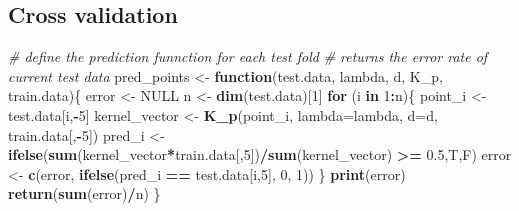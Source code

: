 \documentclass[12pt]{article}
\newenvironment{Shaded}{\begin{snugshade}}{\end{snugshade}}
\newcommand{\AttributeTok}[1]{\textcolor[rgb]{0.13,0.29,0.53}{#1}}
\newcommand{\CommentTok}[1]{\textcolor[rgb]{0.56,0.35,0.01}{\textit{#1}}}
\newcommand{\ConstantTok}[1]{\textcolor[rgb]{0.56,0.35,0.01}{#1}}
\newcommand{\ControlFlowTok}[1]{\textcolor[rgb]{0.13,0.29,0.53}{\textbf{#1}}}
\newcommand{\DecValTok}[1]{\textcolor[rgb]{0.00,0.00,0.81}{#1}}
\newcommand{\DocumentationTok}[1]{\textcolor[rgb]{0.56,0.35,0.01}{\textbf{\textit{#1}}}}
\newcommand{\FloatTok}[1]{\textcolor[rgb]{0.00,0.00,0.81}{#1}}
\newcommand{\FunctionTok}[1]{\textcolor[rgb]{0.13,0.29,0.53}{\textbf{#1}}}
\newcommand{\NormalTok}[1]{#1}
\newcommand{\OtherTok}[1]{\textcolor[rgb]{0.56,0.35,0.01}{#1}}
\newcommand{\RegionMarkerTok}[1]{#1}
\newcommand{\SpecialCharTok}[1]{\textcolor[rgb]{0.81,0.36,0.00}{\textbf{#1}}}
\begin{document}
\begin{Shaded}
\end{Shaded}

\subsection{Cross validation}\label{cross-validation}

\begin{Shaded}
\begin{Highlighting}[]
\CommentTok{\# define the prediction funnction for each test fold}
\CommentTok{\# returns the error rate of current test data}
\NormalTok{pred\_points }\OtherTok{\textless{}{-}} \ControlFlowTok{function}\NormalTok{(test.data, lambda, d, K\_p, train.data)\{}
\NormalTok{error }\OtherTok{\textless{}{-}} \ConstantTok{NULL}
\NormalTok{n }\OtherTok{\textless{}{-}} \FunctionTok{dim}\NormalTok{(test.data)[}\DecValTok{1}\NormalTok{]}
\ControlFlowTok{for}\NormalTok{ (i }\ControlFlowTok{in} \DecValTok{1}\SpecialCharTok{:}\NormalTok{n)\{}
\NormalTok{point\_i }\OtherTok{\textless{}{-}}\NormalTok{ test.data[i,}\SpecialCharTok{{-}}\DecValTok{5}\NormalTok{]}
\NormalTok{kernel\_vector }\OtherTok{\textless{}{-}} \FunctionTok{K\_p}\NormalTok{(point\_i, }\AttributeTok{lambda=}\NormalTok{lambda, }\AttributeTok{d=}\NormalTok{d, train.data[,}\SpecialCharTok{{-}}\DecValTok{5}\NormalTok{])}
\NormalTok{pred\_i }\OtherTok{\textless{}{-}} \FunctionTok{ifelse}\NormalTok{(}\FunctionTok{sum}\NormalTok{(kernel\_vector}\SpecialCharTok{*}\NormalTok{train.data[,}\DecValTok{5}\NormalTok{])}\SpecialCharTok{/}\FunctionTok{sum}\NormalTok{(kernel\_vector) }\SpecialCharTok{\textgreater{}=} \FloatTok{0.5}\NormalTok{,T,F)}
\NormalTok{error }\OtherTok{\textless{}{-}} \FunctionTok{c}\NormalTok{(error, }\FunctionTok{ifelse}\NormalTok{(pred\_i }\SpecialCharTok{==}\NormalTok{ test.data[i,}\DecValTok{5}\NormalTok{], }\DecValTok{0}\NormalTok{, }\DecValTok{1}\NormalTok{))}
\NormalTok{\}}
\FunctionTok{print}\NormalTok{(error)}
\FunctionTok{return}\NormalTok{(}\FunctionTok{sum}\NormalTok{(error)}\SpecialCharTok{/}\NormalTok{n)}
\NormalTok{\}}
\end{Highlighting}
\end{Shaded}
\end{document}
